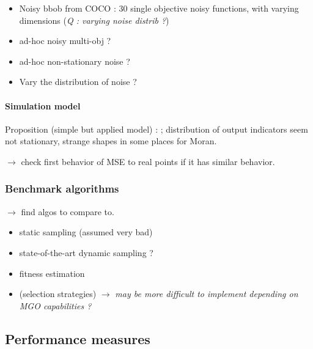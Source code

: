 \begin{itemize}
\item Noisy bbob from COCO \cite{2016arXiv160308776H} : 30 single objective noisy functions, with varying dimensions (\textit{Q : varying noise distrib ?})
\item ad-hoc noisy multi-obj ?
\item ad-hoc non-stationary noise ?
\item Vary the distribution of noise ?
\end{itemize}



\paragraph{Simulation model}

Proposition (simple but applied model) : \cite{2017arXiv170806743R} ; distribution of output indicators seem not stationary, strange shapes in some places for Moran.

$\rightarrow$ check first behavior of MSE to real points if it has similar behavior.


\subsubsection{Benchmark algorithms}

$\rightarrow$ find algos to compare to.

\begin{itemize}
\item static sampling (assumed very bad)
\item state-of-the-art dynamic sampling ?
\item fitness estimation
\item (selection strategies) $\rightarrow$ \textit{may be more difficult to implement depending on MGO capabilities ?}
\end{itemize}


\subsection{Performance measures}


